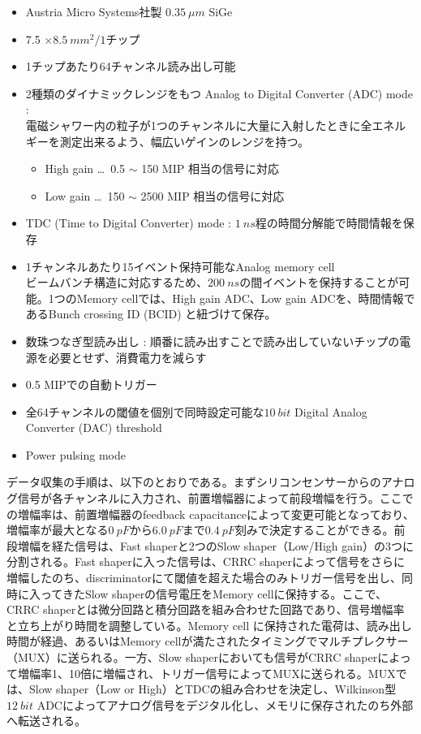  \begin{itemize}
 	\item Austria Micro Systems社製 $\SI{0.35}{\mu m}$ SiGe
	\item 7.5 $\times \SI{8.5}{mm^2} /1チップ$
	\item 1チップあたり64チャンネル読み出し可能
	\item 2種類のダイナミックレンジをもつ Analog to Digital Converter (ADC) mode :\\
		電磁シャワー内の粒子が1つのチャンネルに大量に入射したときに全エネルギーを測定出来るよう、幅広いゲインのレンジを持つ。
		\begin{itemize}
			\item High gain \ldots \ 0.5 $\sim$ 150 MIP 相当の信号に対応
			\item Low gain \ldots \ 150 $\sim$ 2500 MIP 相当の信号に対応
		\end{itemize}
	\item TDC (Time to Digital Converter) mode : $\SI{1}{ns}$程の時間分解能で時間情報を保存
	\item 1チャンネルあたり15イベント保持可能なAnalog memory cell\\
		ビームバンチ構造に対応するため、$\SI{200}{ns}$の間イベントを保持することが可能。1つのMemory cellでは、High gain ADC、Low gain ADCを、時間情報であるBunch crossing ID (BCID) と紐づけて保存。
	\item 数珠つなぎ型読み出し : 順番に読み出すことで読み出していないチップの電源を必要とせず、消費電力を減らす
	\item 0.5 MIPでの自動トリガー
	\item 全64チャンネルの閾値を個別で同時設定可能な$\SI{10}{bit}$ Digital Analog Converter (DAC) threshold
	\item Power pulsing mode
 \end{itemize}
データ収集の手順は、以下のとおりである。まずシリコンセンサーからのアナログ信号が各チャンネルに入力され、前置増幅器によって前段増幅を行う。ここでの増幅率は、前置増幅器のfeedback capacitanceによって変更可能となっており、増幅率が最大となる$\SI{0}{pF}$から$\SI{6.0}{pF}$まで$\SI{0.4}{pF}$刻みで決定することができる。前段増幅を経た信号は、Fast shaperと2つのSlow shaper（Low/High gain）の3つに分割される。Fast shaperに入った信号は、CRRC shaperによって信号をさらに増幅したのち、discriminatorにて閾値を超えた場合のみトリガー信号を出し、同時に入ってきたSlow shaperの信号電圧をMemory cellに保持する。ここで、CRRC shaperとは微分回路と積分回路を組み合わせた回路であり、信号増幅率と立ち上がり時間を調整している。Memory cell に保持された電荷は、読み出し時間が経過、あるいはMemory cellが満たされたタイミングでマルチプレクサー（MUX）に送られる。一方、Slow shaperにおいても信号がCRRC shaperによって増幅率1、10倍に増幅され、トリガー信号によってMUXに送られる。MUXでは、Slow shaper（Low or High）とTDCの組み合わせを決定し、Wilkinson型$\SI{12}{bit}$ ADCによってアナログ信号をデジタル化し、メモリに保存されたのち外部へ転送される。
